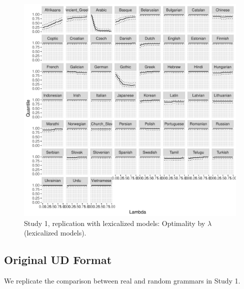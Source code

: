 \documentclass[10pt,twoside,lineno]{article}
\begin{document}
\begin{figure}
	\centering
	\includegraphics[width=\textwidth]{../results/plane/unlexicalized/analyze_pareto_optimality/figures/quantileByLambda-mle.pdf}
	\caption{Study 1, replication with lexicalized models: Optimality by $\lambda$ (lexicalized models).}\label{fig:byLambda-noPOS}
\end{figure}


\subsection{Original UD Format}

We replicate the comparison between real and random grammars in Study 1.
\end{document}

